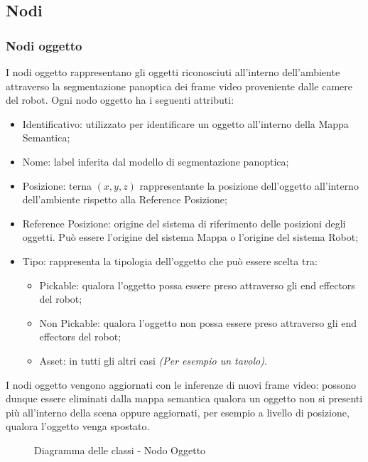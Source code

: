 \subsection{Nodi}
\subsubsection{Nodi oggetto}

I nodi oggetto rappresentano gli oggetti riconosciuti all'interno dell'ambiente attraverso la segmentazione panoptica dei frame video proveniente dalle camere del robot. Ogni nodo oggetto ha i seguenti attributi:
\begin{itemize}
  \item Identificativo: utilizzato per identificare un oggetto all'interno della Mappa Semantica;
  \item Nome: label inferita dal modello di segmentazione panoptica;
  \item Posizione: terna $(x, y, z)$ rappresentante la posizione dell'oggetto all'interno dell'ambiente rispetto alla Reference Posizione;
  \item Reference Posizione: origine del sistema di riferimento delle posizioni degli oggetti. Può essere l'origine del sistema Mappa o l'origine del sistema Robot;
  \item Tipo: rappresenta la tipologia dell'oggetto che può essere scelta tra:
        \begin{itemize}
          \item Pickable: qualora l'oggetto possa essere preso attraverso gli end effectors del robot;
          \item Non Pickable: qualora l'oggetto non possa essere preso attraverso gli end effectors del robot;
          \item Asset: in tutti gli altri casi \textit{(Per esempio un tavolo)}.
        \end{itemize}
\end{itemize}
I nodi oggetto vengono aggiornati con le inferenze di nuovi frame video: possono dunque essere eliminati dalla mappa semantica qualora un oggetto non si presenti più all'interno della scena oppure aggiornati, per esempio a livello di posizione, qualora l'oggetto venga spostato.

\begin{figure}[h]
  \centering
  \caption{Diagramma delle classi - Nodo Oggetto}
\end{figure}

